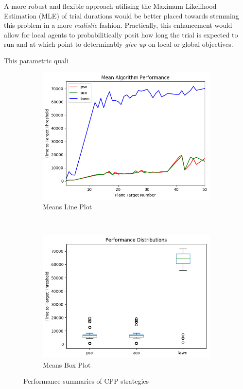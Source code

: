 \documentclass{report}
\begin{document}
A more robust and flexible approach utilising the Maximum Likelihood Estimation (MLE) of trial durations would be better placed towards stemming this problem in a more \textit{realistic} fashion. Practically, this enhancement would allow for local agents to probabilitically posit how long the trial is expected to run and at which point to determinably \textit{give up} on local or global objectives.

This parametric quali
\begin{figure}[h]
	\begin{subfigure}[b]{0.5\textwidth}
		\centering
		\includegraphics[width=\textwidth]{images/all_means_line_plot}
		\caption{Means Line Plot}
		\label{fig:means_line}
	\end{subfigure}
	~
	\begin{subfigure}[b]{0.5\textwidth}
		\centering
		\includegraphics[width=\textwidth]{images/all_means_box_plot}
		\caption{Means Box Plot}
		\label{fig:means_box}
	\end{subfigure}
	\caption{Performance summaries of CPP strategies}
	\label{fig:means_stat}
\end{figure}
\end{document}
